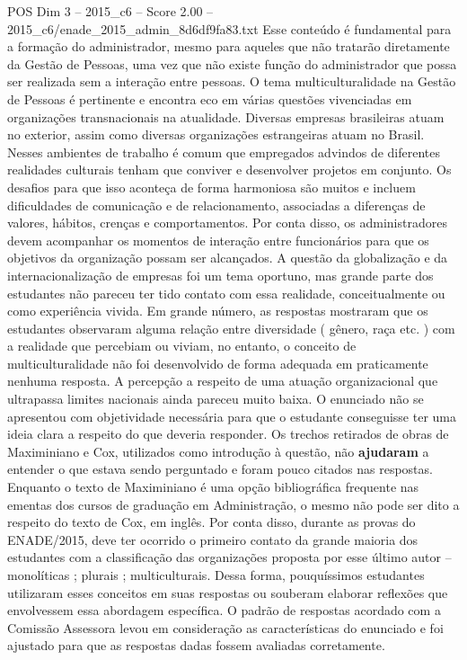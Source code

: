 \begin{textsample}{POS Dim 3 – 2015\_c6 – Score 2.00 – 2015\_c6/enade\_2015\_admin\_8d6df9fa83.txt}
Esse conteúdo é fundamental para a formação do administrador, mesmo para aqueles que não tratarão diretamente da Gestão de Pessoas, uma vez que não existe função do administrador que possa ser realizada sem a interação entre pessoas.
O tema multiculturalidade na Gestão de Pessoas é pertinente e encontra eco em várias questões vivenciadas em organizações transnacionais na atualidade.
Diversas empresas brasileiras atuam no exterior, assim como diversas organizações estrangeiras atuam no Brasil.
Nesses ambientes de trabalho é comum que empregados advindos de diferentes realidades culturais tenham que conviver e desenvolver projetos em conjunto.
Os desafios para que isso aconteça de forma harmoniosa são muitos e incluem dificuldades de comunicação e de relacionamento, associadas a diferenças de valores, hábitos, crenças e comportamentos.
Por conta disso, os administradores devem acompanhar os momentos de interação entre funcionários para que os objetivos da organização possam ser alcançados.
A questão da globalização e da internacionalização de empresas foi um tema oportuno, mas grande parte dos estudantes não pareceu ter tido contato com essa realidade, conceitualmente ou como experiência vivida.
Em grande número, as respostas mostraram que os estudantes observaram alguma relação entre diversidade ( gênero, raça etc. ) com a realidade que percebiam ou viviam, no entanto, o conceito de multiculturalidade não foi desenvolvido de forma adequada em praticamente nenhuma resposta.
A percepção a respeito de uma atuação organizacional que ultrapassa limites nacionais ainda pareceu muito baixa.
O enunciado não se apresentou com objetividade necessária para que o estudante conseguisse ter uma ideia clara a respeito do que deveria responder.
Os trechos retirados de obras de Maximiniano e Cox, utilizados como introdução à questão, não \textbf{ajudaram} a entender o que estava sendo perguntado e foram pouco citados nas respostas.
Enquanto o texto de Maximiniano é uma opção bibliográfica frequente nas ementas dos cursos de graduação em Administração, o mesmo não pode ser dito a respeito do texto de Cox, em inglês.
Por conta disso, durante as provas do ENADE/2015, deve ter ocorrido o primeiro contato da grande maioria dos estudantes com a classificação das organizações proposta por esse último autor – monolíticas ; plurais ; multiculturais.
Dessa forma, pouquíssimos estudantes utilizaram esses conceitos em suas respostas ou souberam elaborar reflexões que envolvessem essa abordagem específica.
O padrão de respostas acordado com a Comissão Assessora levou em consideração as características do enunciado e foi ajustado para que as respostas dadas fossem avaliadas corretamente.

\end{textsample}

